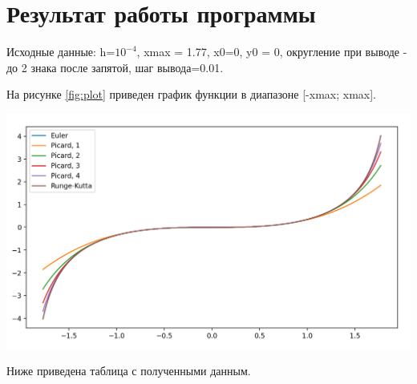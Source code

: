 \documentclass[12pt]{report}
\begin{document}


\chapter{Результат работы программы}

Исходные данные: h=$10^{-4}$, xmax = 1.77, x0=0, y0 = 0, округление при выводе - до 2 знака после запятой, шаг вывода=0.01.


На рисунке \ref{fig:plot} приведен график функции в диапазоне [-xmax; xmax].

\includegraphics[scale=0.6]{img/plot}\label{fig:plot}

Ниже приведена таблица с полученными данным.
\end{document}
